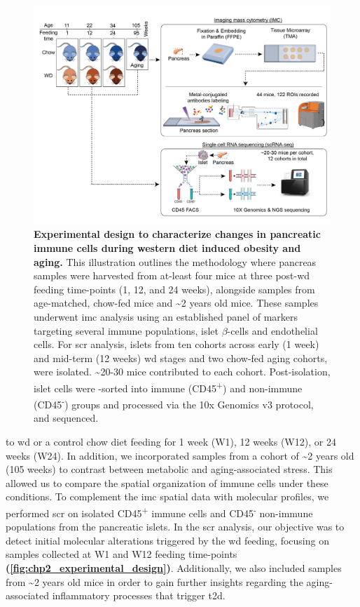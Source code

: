 \begin{figure}[H]
\centering
\includegraphics[width=15cm]{Chapter4/Fig/F2-1-01.png}
\caption[Experimental design to study western diet induced obesity and aging]{\textbf{Experimental design to characterize changes in pancreatic immune cells during western diet induced obesity and aging.} This illustration outlines the methodology where pancreas samples were harvested from at-least four mice at three post-\gls{wd} feeding time-points (1, 12, and 24 weeks), alongside samples from age-matched, chow-fed mice and \textasciitilde2 years old mice. These samples underwent \gls{imc} analysis using an established panel of markers targeting several immune populations, islet $\beta$-cells and endothelial cells. For \gls{scr} analysis, islets from ten cohorts across early (1 week) and mid-term (12 weeks) \gls{wd} stages and two chow-fed aging cohorts, were isolated. \textasciitilde20-30 mice contributed to each cohort. Post-isolation, islet cells were -sorted into immune (CD45\textsuperscript{+}) and non-immune (CD45\textsuperscript{-}) groups and processed via the 10x Genomics v3 protocol, and sequenced.}
\label{fig:chp2_experimental_design}
\end{figure}

 to \gls{wd} or a control chow diet feeding for 1 week (W1), 12 weeks (W12), or 24 weeks (W24). In addition, we incorporated samples from a cohort of \textasciitilde2 years old (105 weeks) to contrast between metabolic and aging-associated stress. This allowed us to compare the spatial organization of immune cells under these conditions. To complement the \gls{imc} spatial data with molecular profiles, we performed \gls{scr} on isolated CD45\textsuperscript{+} immune cells and CD45\textsuperscript{-} non-immune populations from the pancreatic islets. In the \gls{scr} analysis, our objective was to detect initial molecular alterations triggered by the \gls{wd} feeding, focusing on samples collected at W1 and W12 feeding time-points \textbf{(\autoref{fig:chp2_experimental_design})}. Additionally, we also included samples from \textasciitilde2 years old mice in order to gain further insights regarding the aging-associated inflammatory processes that trigger \gls{t2d}.  %


